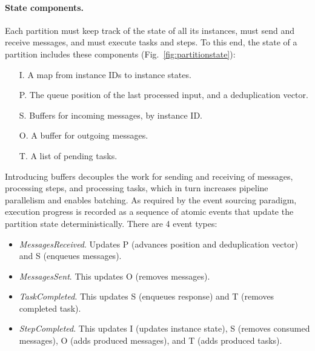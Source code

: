\paragraph{State components. }Each partition must keep track of the state of all its instances, must send and receive messages, and must execute tasks and steps. To this end, the state of a partition includes these components (Fig.~\ref{fig:partitionstate}):
\begin{itemize}
    \item[I.] A map from instance IDs to instance states.  
    \item[P.] The queue position of the last processed input, and a deduplication vector.
    \item[S.] Buffers for incoming messages, by instance ID.
    \item[O.] A buffer for outgoing messages.
    \item[T.] A list of pending tasks.
\end{itemize}
%
Introducing buffers decouples the work for sending and receiving of messages, processing steps, and processing tasks, which in turn increases pipeline parallelism and enables batching. As required by the event sourcing paradigm, execution progress is recorded as a sequence of atomic events that update the partition state deterministically. There are 4 event types:
\begin{itemize}
    \item \textsl{MessagesReceived}. Updates P (advances position and deduplication vector) and S (enqueues messages).
    \item \textsl{MessagesSent}. This updates O (removes messages).
    \item \textsl{TaskCompleted}. This updates S (enqueues response) and T (removes completed task).
    \item \textsl{StepCompleted}. This updates I (updates instance state), S (removes consumed messages), O (adds produced messages), and T (adds produced tasks).
\end{itemize}


